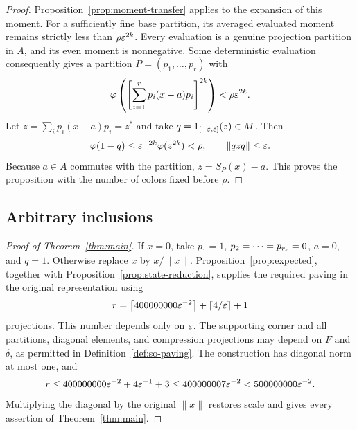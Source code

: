 \begin{proof}
Proposition~\ref{prop:moment-transfer} applies to the expansion of this moment. For a sufficiently fine base partition, its averaged evaluated moment remains strictly less than $\rho\varepsilon^{2k}$. Every evaluation is a genuine projection partition in $A$, and its even moment is nonnegative. Some deterministic evaluation consequently gives a partition $P=(p_1,\ldots,p_r)$ with
\[
 \varphi\left(\left[\sum_{i=1}^r p_i(x-a)p_i\right]^{2k}\right)
 <\rho\varepsilon^{2k}.
\]
Let $z=\sum_i p_i(x-a)p_i=z^*$ and take $q=1_{[-\varepsilon,\varepsilon]}(z)\in M$. Then
\[
 \varphi(1-q)\le\varepsilon^{-2k}\varphi(z^{2k})<\rho,
 \qquad \|qzq\|\le\varepsilon.
\]
Because $a\in A$ commutes with the partition, $z=S_P(x)-a$. This proves the proposition with the number of colors fixed before $\rho$.
\end{proof}

\subsection{Arbitrary inclusions}

\begin{proof}[Proof of Theorem~\ref{thm:main}]
If $x=0$, take $p_1=1$, $p_2=\cdots=p_{r_\varepsilon}=0$, $a=0$, and $q=1$. Otherwise replace $x$ by $x/\|x\|$. Proposition~\ref{prop:expected}, together with Proposition~\ref{prop:state-reduction}, supplies the required paving in the original representation using
\[
 r=\left\lceil400000000\varepsilon^{-2}\right\rceil
      +\left\lceil4/\varepsilon\right\rceil+1
\]
projections. This number depends only on $\varepsilon$. The supporting corner and all partitions, diagonal elements, and compression projections may depend on $F$ and $\delta$, as permitted in Definition~\ref{def:so-paving}. The construction has diagonal norm at most one, and
\[
 r\le400000000\varepsilon^{-2}+4\varepsilon^{-1}+3
 \le400000007\varepsilon^{-2}<500000000\varepsilon^{-2}.
\]
Multiplying the diagonal by the original $\|x\|$ restores scale and gives every assertion of Theorem~\ref{thm:main}.
\end{proof}
